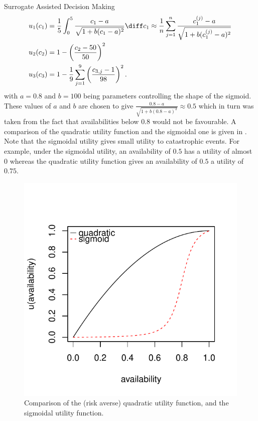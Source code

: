 \begin{chapter}{Surrogate Assisted Decision Making \label{Chap:optimisation}}
\begin{align*}
    u_1(c_1) &= \frac{1}{5} \int_0^5 \frac{c_1 - a}{\sqrt{1 + b(c_1-a)^2}} \diff c_1      \approx \frac{1}{n}\sum_{j=1}^n \frac{c_1^{(j)} - a}{\sqrt{1 + b(c_1^{(j)}-a)^2}} \\
    u_2(c_2) &=  1-  \left(\frac{c_2 - 50}{50}  \right) ^2 \\
    u_3(c_3) &=  1 - \frac{1}{9}\sum_{j=1}^9   \left(\frac{c_{3,j} - 1}{98} \right)^2.
\end{align*}
with $a=0.8$ and $b=100$ being parameters controlling the shape of the sigmoid. These values of $a$ and $b$ are chosen to give
$\frac{0.8 - a}{\sqrt{1 + b(0.8-a)^2}} \approx 0.5 $ which in turn was taken from the fact that availabilities below $0.8$ would not be favourable. A comparison of the quadratic utility function and the sigmoidal one is given in . Note that the sigmoidal utility gives small utility to catastrophic events. For example, under the sigmoidal utility, an availability of $0.5$ has a utility of almost $0$ whereas the quadratic utility function gives an availability of $0.5$ a utility of $0.75$.
\begin{figure}[h]
  \centering
  \includegraphics{fig-optim2/quad-sig.pdf}
  \caption{Comparison of the (risk averse) quadratic utility function, and the sigmoidal utility function.}
  \label{Fig:quad-sig}
\end{figure}


\end{chapter}
